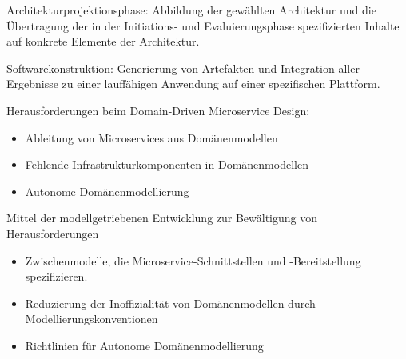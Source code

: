 {Architekturprojektionsphase: Abbildung der gewählten Architektur und die Übertragung der in der Initiations- und Evaluierungsphase spezifizierten Inhalte auf konkrete Elemente der Architektur.

Softwarekonstruktion: Generierung von Artefakten und Integration aller Ergebnisse zu einer lauffähigen Anwendung auf einer spezifischen Plattform.

\cite[S.62-66]{rempp}

Herausforderungen beim Domain-Driven Microservice Design:

\begin{itemize}
\item Ableitung von Microservices aus Domänenmodellen
\item Fehlende Infrastrukturkomponenten in Domänenmodellen
\item Autonome Domänenmodellierung
\end{itemize}

Mittel der modellgetriebenen Entwicklung zur Bewältigung von Herausforderungen
\begin{itemize}
\item Zwischenmodelle, die Microservice-Schnittstellen und -Bereitstellung spezifizieren.
\item Reduzierung der Inoffizialität von Domänenmodellen durch Modellierungskonventionen
\item Richtlinien für Autonome Domänenmodellierung
\end{itemize}

\cite{rademacher}


}
